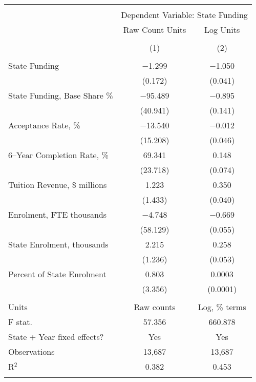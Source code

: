 
\begin{tabular}{@{\extracolsep{5pt}}lcc} 
\\[-1.8ex]\hline 
\hline \\[-1.8ex] 
 & \multicolumn{2}{c}{Dependent Variable: State Funding} \\ 
\cline{2-3} 
 & Raw Count Units & Log Units \\ 
\\[-1.8ex] & (1) & (2)\\ 
\hline \\[-1.8ex] 
 State Funding & $-$1.299 & $-$1.050 \\ 
  & (0.172) & (0.041) \\ 
  State Funding, Base Share \% & $-$95.489 & $-$0.895 \\ 
  & (40.941) & (0.141) \\ 
  Acceptance Rate, \% & $-$13.540 & $-$0.012 \\ 
  & (15.208) & (0.046) \\ 
  6--Year Completion Rate, \% & 69.341 & 0.148 \\ 
  & (23.718) & (0.074) \\ 
  Tuition Revenue, \$ millions & 1.223 & 0.350 \\ 
  & (1.433) & (0.040) \\ 
  Enrolment, FTE thousands & $-$4.748 & $-$0.669 \\ 
  & (58.129) & (0.055) \\ 
  State Enrolment, thousands & 2.215 & 0.258 \\ 
  & (1.236) & (0.053) \\ 
  Percent of State Enrolment & 0.803 & 0.0003 \\ 
  & (3.356) & (0.0001) \\ 
 \hline \\[-1.8ex] 
Units  & Raw counts & Log, \% terms \\ 
F stat. & 57.356 & 660.878 \\ 
State + Year fixed effects? & Yes & Yes \\ 
Observations & 13,687 & 13,687 \\ 
R$^{2}$ & 0.382 & 0.453 \\ 
\hline 
\hline \\[-1.8ex] 
\end{tabular} 
